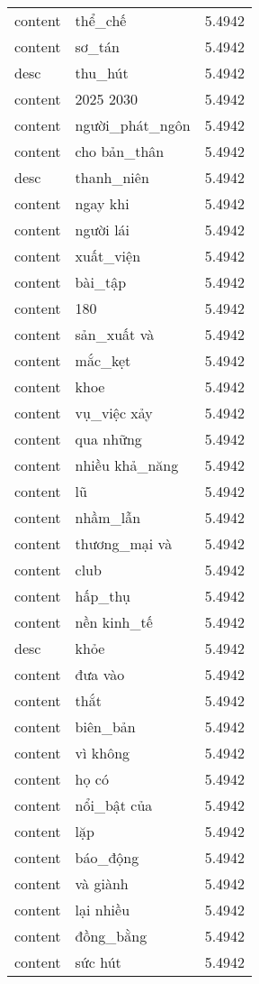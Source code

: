 \documentclass{article}
\begin{document}
\begin{tabular}{lll}
content & thể\_chế & 5.4942\\
content & sơ\_tán & 5.4942\\
desc & thu\_hút & 5.4942\\
content & 2025 2030 & 5.4942\\
content & người\_phát\_ngôn & 5.4942\\
content & cho bản\_thân & 5.4942\\
desc & thanh\_niên & 5.4942\\
content & ngay khi & 5.4942\\
content & người lái & 5.4942\\
content & xuất\_viện & 5.4942\\
content & bài\_tập & 5.4942\\
content & 180 & 5.4942\\
content & sản\_xuất và & 5.4942\\
content & mắc\_kẹt & 5.4942\\
content & khoe & 5.4942\\
content & vụ\_việc xảy & 5.4942\\
content & qua những & 5.4942\\
content & nhiều khả\_năng & 5.4942\\
content & lũ & 5.4942\\
content & nhầm\_lẫn & 5.4942\\
content & thương\_mại và & 5.4942\\
content & club & 5.4942\\
content & hấp\_thụ & 5.4942\\
content & nền kinh\_tế & 5.4942\\
desc & khỏe & 5.4942\\
content & đưa vào & 5.4942\\
content & thắt & 5.4942\\
content & biên\_bản & 5.4942\\
content & vì không & 5.4942\\
content & họ có & 5.4942\\
content & nổi\_bật của & 5.4942\\
content & lặp & 5.4942\\
content & báo\_động & 5.4942\\
content & và giành & 5.4942\\
content & lại nhiều & 5.4942\\
content & đồng\_bằng & 5.4942\\
content & sức hút & 5.4942\\

\end{tabular}
\end{document}
